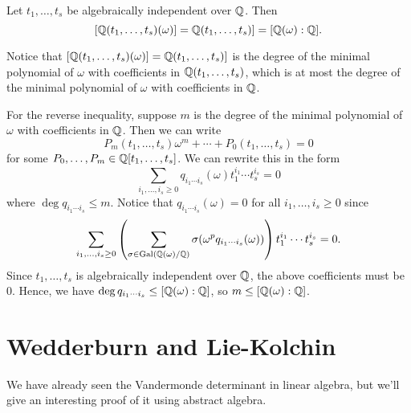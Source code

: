 \begin{lemma}{}
    Let $t_1, \dots, t_s$ be algebraically independent over $\mathbb{Q}$. Then 
    \[ [\mathbb{Q}(t_1, \dots, t_s)(\omega)] = \mathbb{Q}(t_1, \dots, t_s)] = 
    [\mathbb{Q}(\omega) : \mathbb{Q}]. \] 
\end{lemma}
\begin{pf}
    Notice that $[\mathbb{Q}(t_1, \dots, t_s)(\omega)] = \mathbb{Q}(t_1, \dots, t_s)]$ 
    is the degree of the minimal polynomial of $\omega$ with coefficients 
    in $\mathbb{Q}(t_1, \dots, t_s)$, which is at most the degree of the minimal 
    polynomial of $\omega$ with coefficients in $\mathbb{Q}$. 

    For the reverse inequality, suppose $m$ is the degree of the minimal 
    polynomial of $\omega$ with coefficients in $\mathbb{Q}$. Then we can write 
    \[ P_m(t_1, \dots, t_s) \omega^m + \cdots + P_0(t_1, \dots, t_s) = 0 \] 
    for some $P_0, \dots, P_m \in \mathbb{Q}[t_1, \dots, t_s]$. We can rewrite this 
    in the form 
    \[ \sum_{i_1,\dots,i_s \geq 0} q_{i_1\cdots i_s}(\omega) t_1^{i_1} 
    \cdots t_s^{i_s} = 0 \] 
    where $\deg q_{i_1\cdots i_s} \leq m$. Notice that 
    $q_{i_1\cdots i_s}(\omega) = 0$ for all $i_1, \dots, i_s \geq 0$ since 
    \[ \sum_{i_1,\dots, i_s \geq 0} 
    \left( \sum_{\sigma \in \operatorname{Gal}(\mathbb{Q}(\omega)/\mathbb{Q})} \sigma(\omega^p 
    q_{i_1\cdots i_s}(\omega)) \right) t_1^{i_1} \cdots t_s^{i_s} = 0. \] 
    Since $t_1, \dots, t_s$ is algebraically independent over $\mathbb{Q}$, the 
    above coefficients must be $0$. Hence, we have $\deg q_{i_1\cdots i_s} \leq
    [\mathbb{Q}(\omega) : \mathbb{Q}]$, so $m \leq [\mathbb{Q}(\omega) : \mathbb{Q}]$. 
\end{pf}

\section{Wedderburn and Lie-Kolchin}
We have already seen the Vandermonde determinant in linear algebra, but we'll 
give an interesting proof of it using abstract algebra. 

